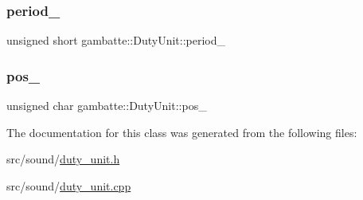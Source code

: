 \subsubsection{\texorpdfstring{period\+\_\+}{period\_}}
{\footnotesize\ttfamily unsigned short gambatte\+::\+Duty\+Unit\+::period\+\_\+\hspace{0.3cm}{\ttfamily [private]}}

\mbox{\label{classgambatte_1_1DutyUnit_a357ce9a2491fe91fa402d21b1ca7805e}} 
\subsubsection{\texorpdfstring{pos\+\_\+}{pos\_}}
{\footnotesize\ttfamily unsigned char gambatte\+::\+Duty\+Unit\+::pos\+\_\+\hspace{0.3cm}{\ttfamily [private]}}



The documentation for this class was generated from the following files\+:\begin{DoxyCompactItemize}
\item 
src/sound/\hyperlink{duty__unit_8h}{duty\+\_\+unit.\+h}\item 
src/sound/\hyperlink{duty__unit_8cpp}{duty\+\_\+unit.\+cpp}\end{DoxyCompactItemize}
